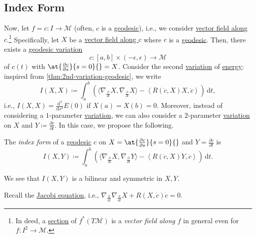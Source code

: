 \subsection{Index Form}
Now, let \(f = c\colon I \to \mathcal{M} \) (often, \(c\) is a \hyperref[def:geodesic]{geodesic}), i.e., we consider \hyperref[def:vector-field-along-curve]{vector field along} \(c\).\footnote{In deed, a \hyperref[def:section]{section} of \(f^{\ast} (T \mathcal{M} )\) is a \emph{vector field along \(f\)} in general even for \(f\colon I^2 \to \mathcal{M} \).} Specifically, let \(X\) be a \hyperref[def:vector-field-along-curve]{vector field along \(c\)} where \(c\) is a \hyperref[def:geodesic]{geodesic}. Then, there exists a \hyperref[def:geodesic-variation]{geodesic variation}
\[
	c\colon [a, b] \times (-\epsilon , \epsilon )\to \mathcal{M}
\]
of \(c(t)\) with \(\at{\frac{\partial c}{\partial s} }{s=0}{} = X\). Consider the second \hyperref[prev:variation]{variation} of \hyperref[def:energy]{energy}: inspired from \autoref{thm:2nd-variation-geodesic}, we write
\[
	I(X, X)
	\coloneqq \int_{a}^{b} \left( \langle \nabla _{\frac{\partial }{\partial t} }X, \nabla _{\frac{\partial }{\partial t} } X \rangle - \left\langle R(\dot{c}, X )X, \dot{c}  \right\rangle  \right)  \,\mathrm{d}t,
\]
i.e., \(I(X, X) = \frac{\mathrm{d}^2}{\mathrm{d}s^2} E(0)\) if \(X(a) = X(b) = 0\). Moreover, instead of considering a \(1\)-parameter \hyperref[prev:variation]{variation}, we can also consider a \(2\)-parameter \hyperref[prev:variation]{variation} on \(X\) and \(Y \coloneqq \frac{\partial c}{\partial t}\). In this case, we propose the following.

\begin{definition}\label{def:index-form}
	The \emph{index form} of a \hyperref[def:geodesic]{geodesic} \(c\) on \(X = \at{\frac{\partial c}{\partial s} }{s=0}{} \) and \(Y = \frac{\partial c}{\partial t}\) is
	\[
		I(X, Y)
		\coloneqq \int_{a}^{b} \left( \langle \nabla _{\frac{\partial }{\partial t} } X, \nabla _{\frac{\partial }{\partial t} } Y \rangle - \left\langle R(\dot{c} , X) Y, \dot{c} \right\rangle \right)  \,\mathrm{d}t.
	\]
\end{definition}

\begin{note}
	We see that \(I(X, Y)\) is a bilinear and symmetric in \(X, Y\).
\end{note}

\begin{prev}
	Recall the \hyperref[eq:Jacobi]{Jacobi equation}, i.e., \(\nabla _{\frac{\mathrm{d}}{\mathrm{d}t} }\nabla _{\frac{\mathrm{d}}{\mathrm{d}t} }X + R(X, \dot{c} )\dot{c} = 0\).
\end{prev}

